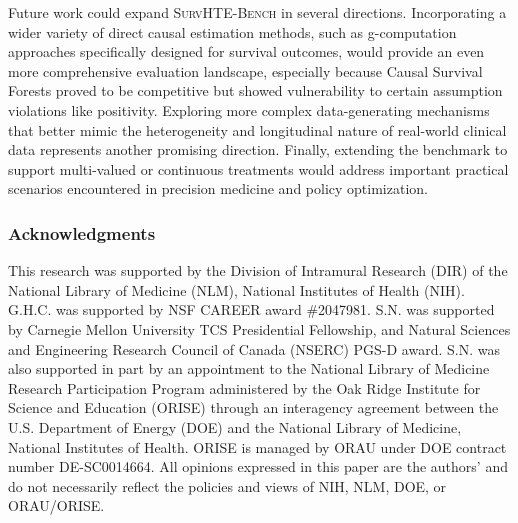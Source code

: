 \documentclass{article} %
\begin{document}
Future work could expand \textsc{SurvHTE-Bench} in several directions. Incorporating a wider variety of direct causal estimation methods, such as g-computation approaches 
specifically designed for survival outcomes, would provide an even more comprehensive evaluation landscape, especially because Causal Survival Forests proved to be competitive but showed vulnerability to certain assumption violations like positivity. %
Exploring more complex data-generating mechanisms that better mimic the heterogeneity and longitudinal nature of real-world clinical data represents another promising direction. Finally, extending the benchmark to support multi-valued or continuous treatments would address important practical scenarios encountered in precision medicine and policy optimization. 




\newpage
\vspace{-.5em}
\subsubsection*{Acknowledgments}
This research was supported by the Division of Intramural Research (DIR) of the National Library of Medicine (NLM), National Institutes of Health (NIH). 
G.H.C. was supported by NSF CAREER award \#2047981. S.N. was supported by Carnegie Mellon University TCS Presidential Fellowship, and Natural Sciences and Engineering Research Council of Canada (NSERC) PGS-D award. S.N. was also supported in part by an appointment to the National Library of Medicine Research Participation Program administered by the Oak Ridge Institute for Science and Education (ORISE) through an interagency agreement between the U.S. Department of Energy (DOE) and the National Library of Medicine, National Institutes of Health. ORISE is managed by ORAU under DOE contract number DE-SC0014664. All opinions expressed in this paper are the authors’ and do not necessarily reflect the policies and views of NIH, NLM, DOE, or ORAU/ORISE.
\end{document}
